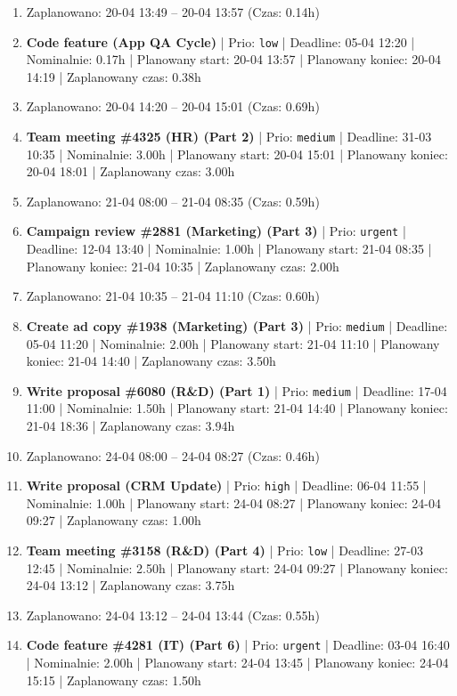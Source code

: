 {\begin{enumerate}
  \item [\textbf{PRZERWA}] Zaplanowano: 20-04 13:49 -- 20-04 13:57 (Czas: 0.14h)
  \item [\textbf{14703}] \textbf{Code feature (App QA Cycle)} | Prio: \texttt{low} | Deadline: 05-04 12:20 | Nominalnie: 0.17h | Planowany start: 20-04 13:57 | Planowany koniec: 20-04 14:19 | Zaplanowany czas: 0.38h
  \item [\textbf{PRZERWA}] Zaplanowano: 20-04 14:20 -- 20-04 15:01 (Czas: 0.69h)
  \item [\textbf{14641}] \textbf{Team meeting \#4325 (HR) (Part 2)} | Prio: \texttt{medium} | Deadline: 31-03 10:35 | Nominalnie: 3.00h | Planowany start: 20-04 15:01 | Planowany koniec: 20-04 18:01 | Zaplanowany czas: 3.00h
  \item [\textbf{PRZERWA}] Zaplanowano: 21-04 08:00 -- 21-04 08:35 (Czas: 0.59h)
  \item [\textbf{14599}] \textbf{Campaign review \#2881 (Marketing) (Part 3)} | Prio: \texttt{urgent} | Deadline: 12-04 13:40 | Nominalnie: 1.00h | Planowany start: 21-04 08:35 | Planowany koniec: 21-04 10:35 | Zaplanowany czas: 2.00h
  \item [\textbf{PRZERWA}] Zaplanowano: 21-04 10:35 -- 21-04 11:10 (Czas: 0.60h)
  \item [\textbf{14652}] \textbf{Create ad copy \#1938 (Marketing) (Part 3)} | Prio: \texttt{medium} | Deadline: 05-04 11:20 | Nominalnie: 2.00h | Planowany start: 21-04 11:10 | Planowany koniec: 21-04 14:40 | Zaplanowany czas: 3.50h
  \item [\textbf{14669}] \textbf{Write proposal \#6080 (R\&D) (Part 1)} | Prio: \texttt{medium} | Deadline: 17-04 11:00 | Nominalnie: 1.50h | Planowany start: 21-04 14:40 | Planowany koniec: 21-04 18:36 | Zaplanowany czas: 3.94h
  \item [\textbf{PRZERWA}] Zaplanowano: 24-04 08:00 -- 24-04 08:27 (Czas: 0.46h)
  \item [\textbf{14629}] \textbf{Write proposal (CRM Update)} | Prio: \texttt{high} | Deadline: 06-04 11:55 | Nominalnie: 1.00h | Planowany start: 24-04 08:27 | Planowany koniec: 24-04 09:27 | Zaplanowany czas: 1.00h
  \item [\textbf{14688}] \textbf{Team meeting \#3158 (R\&D) (Part 4)} | Prio: \texttt{low} | Deadline: 27-03 12:45 | Nominalnie: 2.50h | Planowany start: 24-04 09:27 | Planowany koniec: 24-04 13:12 | Zaplanowany czas: 3.75h
  \item [\textbf{PRZERWA}] Zaplanowano: 24-04 13:12 -- 24-04 13:44 (Czas: 0.55h)
  \item [\textbf{14604}] \textbf{Code feature \#4281 (IT) (Part 6)} | Prio: \texttt{urgent} | Deadline: 03-04 16:40 | Nominalnie: 2.00h | Planowany start: 24-04 13:45 | Planowany koniec: 24-04 15:15 | Zaplanowany czas: 1.50h

\end{enumerate}}
